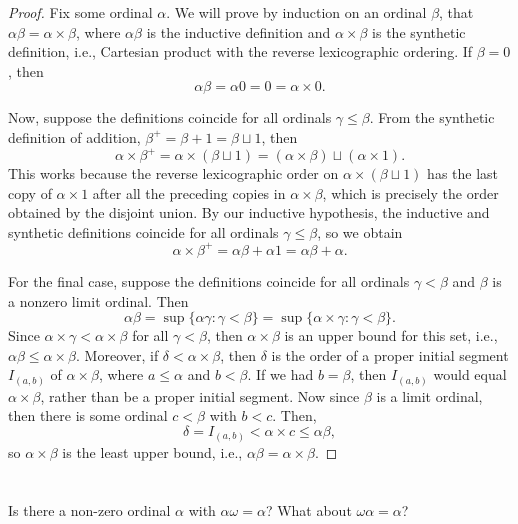 \documentclass[12pt]{article}
\newenvironment{pbox}
    {\begin{lrbox}{\mybox}\begin{minipage}{0.98\textwidth}}
    {\end{minipage}\end{lrbox}\begin{center}\framebox[\textwidth]{\usebox{\mybox}}\end{center}}
\theoremstyle{definition}
\begin{document}
\begin{proof}
    Fix some ordinal $\alpha$. We will prove by induction on an ordinal $\beta$, that $\alpha\beta = \alpha \times \beta$, where $\alpha\beta$ is the inductive definition and $\alpha \times \beta$ is the synthetic definition, i.e., Cartesian product with the reverse lexicographic ordering. If $\beta = 0$, then
    \[
        \alpha\beta = \alpha0 = 0 = \alpha \times 0.
    \]
    
    Now, suppose the definitions coincide for all ordinals $\gamma \leq \beta$. From the synthetic definition of addition, $\beta^+ = \beta + 1 = \beta \sqcup 1$, then
    \[
        \alpha \times \beta^+ 
            = \alpha \times (\beta \sqcup 1) 
            = (\alpha \times \beta) \sqcup (\alpha \times 1).
    \]
    This works because the reverse lexicographic order on $\alpha \times (\beta \sqcup 1)$ has the last copy of $\alpha \times 1$ after all the preceding copies in $\alpha \times \beta$, which is precisely the order obtained by the disjoint union. By our inductive hypothesis, the inductive and synthetic definitions coincide for all ordinals $\gamma \leq \beta$, so we obtain
    \[
        \alpha \times \beta^+ = \alpha\beta + \alpha1 = \alpha\beta + \alpha.
    \]
    
    For the final case, suppose the definitions coincide for all ordinals $\gamma < \beta$ and $\beta$ is a nonzero limit ordinal. Then
    \[
        \alpha\beta = \sup\{\alpha\gamma : \gamma < \beta\} = \sup\{\alpha \times \gamma : \gamma < \beta\}.
    \]
    Since $\alpha \times \gamma < \alpha \times \beta$ for all $\gamma < \beta$, then $\alpha \times \beta$ is an upper bound for this set, i.e., $\alpha\beta \leq \alpha \times \beta$. Moreover, if $\delta < \alpha \times \beta$, then $\delta$ is the order of a proper initial segment $I_{(a, b)}$ of $\alpha \times \beta$, where $a \leq \alpha$ and $b < \beta$. If we had $b = \beta$, then $I_{(a,b)}$ would equal $\alpha \times \beta$, rather than be a proper initial segment. Now since $\beta$ is a limit ordinal, then there is some ordinal $c < \beta$ with $b < c$. Then,
    \[
        \delta = I_{(a, b)} < \alpha \times c \leq \alpha\beta,
    \]
    so $\alpha \times \beta$ is the least upper bound, i.e., $\alpha\beta = \alpha \times \beta$.
    
\end{proof}

\newpage
\section{}
\begin{pbox}
    Is there a non-zero ordinal $\alpha$ with $\alpha\omega = \alpha$? What about $\omega\alpha = \alpha$?
\end{pbox}
\end{document}
